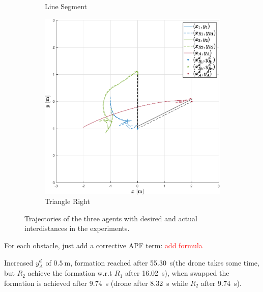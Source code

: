 \documentclass{ifacconf}
\begin{document}
\begin{figure}
\begin{subfigure}[b]{0.31\columnwidth}
      \caption{Line Segment}
   \end{subfigure}
    \begin{subfigure}[b]{0.31\columnwidth}
        \centering
        \includegraphics[width=\linewidth]{images/experiment/nominal/3rd_scenario_exp.eps}
        \caption{Triangle Right}
      \end{subfigure}
   \vspace{-0.2cm}
   \caption{Trajectories of the three agents with desired and actual interdistances in the experiments.}
\end{figure}

For each obstacle, just add a corrective APF term: \textcolor{red}{add formula}

Increased $y_A^d$ of $\SI{0.5}{\meter}$, 
formation reached after \SI{55.30}{\second}(the drone 
takes some time, but $R_2$ achieve the formation w.r.t 
$R_1$ after \SI{16.02}{\second}), when swapped
the formation is achieved after \SI{9.74}{\second} 
(drone after \SI{8.32}{\second}
while $R_2$ after \SI{9.74}{\second}).
\end{document}
